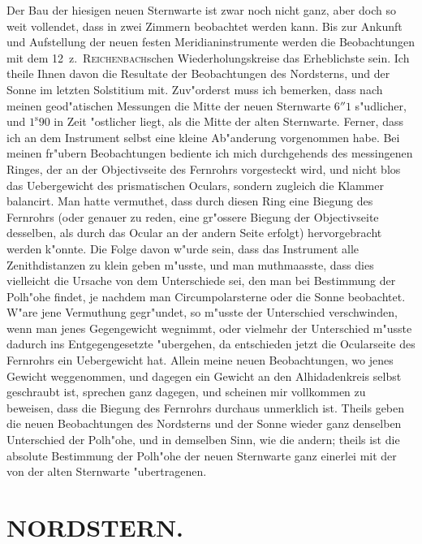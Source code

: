 \documentclass[12pt,a4paper]{article}
\begin{document}
Der Bau der hiesigen neuen Sternwarte ist zwar noch nicht ganz, aber doch so weit vollendet,
dass in zwei Zimmern beobachtet werden kann. Bis zur Ankunft und Aufstellung der neuen festen
Meridianinstrumente werden die Beobachtungen mit dem 12~z.~\textsc{Reichenbach}schen Wiederholungskreise
das Erheblichste sein. Ich theile Ihnen davon die Resultate der Beobachtungen des Nordsterns, und der
Sonne im letzten Solstitium mit. Zuv"orderst muss ich bemerken, dass nach meinen geod"atischen Messungen
die Mitte der neuen Sternwarte $6''1$ s"udlicher, und $1^{\mathrm{s}}90$ in Zeit "ostlicher liegt, als die Mitte der alten
Sternwarte. Ferner, dass ich an dem Instrument selbst eine kleine Ab"anderung vorgenommen habe.
Bei meinen fr"ubern Beobachtungen bediente ich mich durchgehends des messingenen Ringes, der an der
Objectivseite des Fernrohrs vorgesteckt wird, und nicht blos das Uebergewicht des prismatischen Oculars,
sondern zugleich die Klammer balancirt. Man hatte vermuthet, dass durch diesen Ring eine Biegung
des Fernrohrs (oder genauer zu reden, eine gr"ossere Biegung der Objectivseite desselben, als durch das
Ocular an der andern Seite erfolgt) hervorgebracht werden k"onnte. Die Folge davon w"urde sein, dass
das Instrument alle Zenithdistanzen zu klein geben m"usste, und man muthmaasste, dass dies vielleicht die
Ursache von dem Unterschiede sei, den man bei Bestimmung der Polh"ohe findet, je nachdem man
Circumpolarsterne oder die Sonne beobachtet. W"are jene Vermuthung gegr"undet, so m"usste der
Unterschied verschwinden, wenn man jenes Gegengewicht wegnimmt, oder vielmehr der Unterschied
m"usste dadurch ins Entgegengesetzte "ubergehen, da entschieden jetzt die Ocularseite des Fernrohrs ein
Uebergewicht hat. Allein meine neuen Beobachtungen, wo jenes Gewicht weggenommen, und dagegen ein
Gewicht an den Alhidadenkreis selbst geschraubt ist, sprechen ganz dagegen, und scheinen mir vollkommen
zu beweisen, dass die Biegung des Fernrohrs durchaus unmerklich ist. Theils geben die neuen
Beobachtungen des Nordsterns und der Sonne wieder ganz denselben Unterschied der Polh"ohe, und in
demselben Sinn, wie die andern; theils ist die absolute Bestimmung der Polh"ohe der neuen Sternwarte
ganz einerlei mit der von der alten Sternwarte "ubertragenen.

\newpage

\section*{NORDSTERN.}
\end{document}

